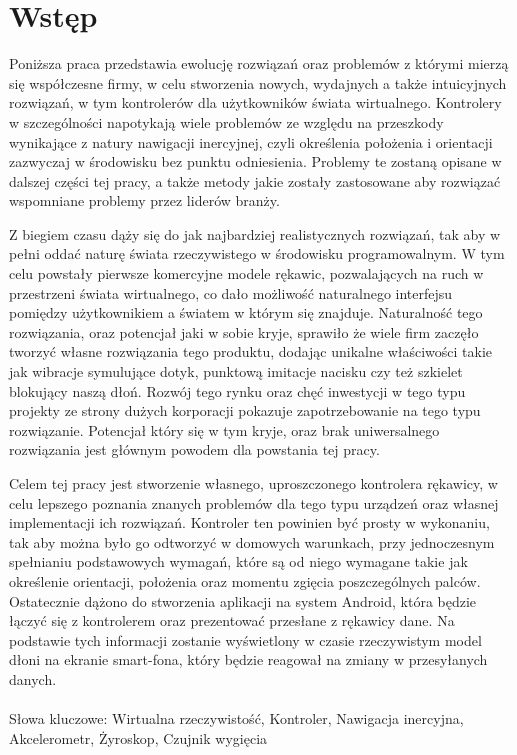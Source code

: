 \chapter{Wstęp}
\label{ch:wstep}
Poniższa praca przedstawia ewolucję rozwiązań oraz problemów z którymi mierzą się współczesne firmy, w celu stworzenia nowych, wydajnych a także intuicyjnych rozwiązań, w tym kontrolerów dla użytkowników świata wirtualnego. Kontrolery w szczególności napotykają wiele problemów ze względu na przeszkody wynikające z natury nawigacji inercyjnej, czyli określenia położenia i orientacji zazwyczaj w środowisku bez punktu odniesienia. Problemy te zostaną opisane w dalszej części tej pracy, a także metody jakie zostały zastosowane aby rozwiązać wspomniane problemy przez liderów branży.

Z biegiem czasu dąży się do jak najbardziej realistycznych rozwiązań, tak aby w pełni oddać naturę świata rzeczywistego w środowisku programowalnym. W tym celu powstały pierwsze komercyjne modele rękawic, pozwalających na ruch w przestrzeni świata wirtualnego, co dało możliwość naturalnego interfejsu pomiędzy użytkownikiem a światem w którym się znajduje. Naturalność tego rozwiązania, oraz potencjał jaki w sobie kryje, sprawiło że wiele firm zaczęło tworzyć własne rozwiązania tego produktu, dodając unikalne właściwości takie jak wibracje symulujące dotyk, punktową imitacje nacisku czy też szkielet blokujący naszą dłoń. Rozwój tego rynku oraz chęć inwestycji w tego typu projekty ze strony dużych korporacji pokazuje zapotrzebowanie na tego typu rozwiązanie. Potencjał który się w tym kryje, oraz brak uniwersalnego rozwiązania jest głównym powodem dla powstania tej pracy.

Celem tej pracy jest stworzenie własnego, uproszczonego kontrolera rękawicy, w celu lepszego poznania znanych problemów dla tego typu urządzeń oraz własnej implementacji ich rozwiązań. Kontroler ten powinien być prosty w wykonaniu, tak aby można było go odtworzyć w domowych warunkach, przy jednoczesnym spełnianiu podstawowych wymagań, które są od niego wymagane takie jak określenie orientacji, położenia oraz momentu zgięcia poszczególnych palców. Ostatecznie dążono do stworzenia aplikacji na system Android, która będzie łączyć się z kontrolerem oraz prezentować przesłane z rękawicy dane. Na podstawie tych informacji zostanie wyświetlony w czasie rzeczywistym model dłoni na ekranie smart-fona, który będzie reagował na zmiany w przesyłanych danych.\\
\\
Słowa kluczowe: Wirtualna rzeczywistość, Kontroler, Nawigacja inercyjna, Akcelerometr, Żyroskop, Czujnik wygięcia